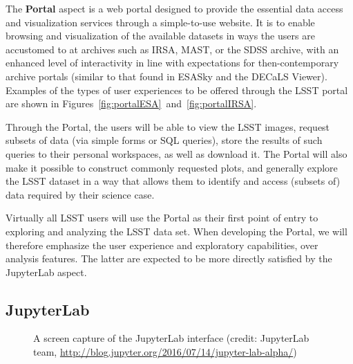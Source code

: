 \documentclass[DM,lsstdraft,toc]{lsstdoc}
\begin{document}
The {\bf Portal} aspect is a web portal designed to provide the essential data
access and visualization services through a simple-to-use website.  It is to
enable browsing and visualization of the available datasets in ways the
users are accustomed to at archives such as IRSA, MAST, or the SDSS archive,
with an enhanced level of interactivity in line with expectations for
then-contemporary archive portals (similar to that found in ESASky and 
the DECaLS Viewer). Examples of the types of user experiences to be offered
through the LSST portal are shown in Figures~\ref{fig:portalESA}~and~\ref{fig:portalIRSA}.

Through the Portal, the users will be
able to view the LSST images, request subsets of data (via simple forms or
SQL queries), store the results of such queries to their personal
workspaces, as well as download it. The Portal will also make it possible to
construct commonly requested plots, and generally explore the
LSST dataset in a way that allows them to identify and access (subsets of)
data required by their science case.

Virtually all LSST users will use the Portal as their first point of entry to
exploring and analyzing the LSST data set. When developing the Portal,
we will therefore emphasize the user experience and exploratory
capabilities, over analysis features. The latter are expected to be more
directly satisfied by the JupyterLab aspect.

\subsection{JupyterLab\label{sec:jupyter}}

\begin{figure}
	\centering
	\caption{A screen capture of the JupyterLab interface (credit: JupyterLab team, \url{http://blog.jupyter.org/2016/07/14/jupyter-lab-alpha/})
		\label{fig:JupyterLab}}
\end{figure}
\end{document}
